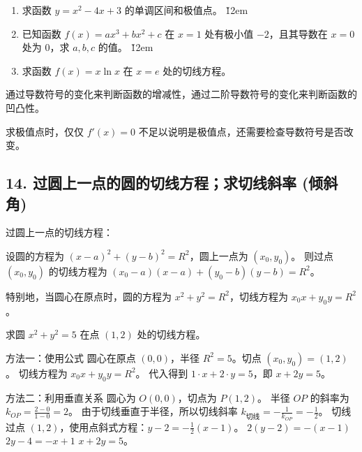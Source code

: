 \begin{problem}
\begin{enumerate}
    \item 求函数 $y = x^2 - 4x + 3$ 的单调区间和极值点。
          \v{12em}
    \item 已知函数 $f(x) = ax^3 + bx^2 + c$ 在 $x=1$ 处有极小值 $-2$，且其导数在 $x=0$ 处为 $0$，求 $a, b, c$ 的值。
          \v{12em}
    \item 求函数 $f(x) = x \ln x$ 在 $x=e$ 处的切线方程。
\end{enumerate}
\end{problem}
\begin{tips}
    通过导数符号的变化来判断函数的增减性，通过二阶导数符号的变化来判断函数的凹凸性。
\end{tips}
\begin{warning}
    求极值点时，仅仅 $f'(x)=0$ 不足以说明是极值点，还需要检查导数符号是否改变。
\end{warning}

\subsection*{14. 过圆上一点的圆的切线方程；求切线斜率 (倾斜角)}
\begin{theorem}
    过圆上一点的切线方程：

    设圆的方程为 $(x-a)^2 + (y-b)^2 = R^2$，圆上一点为 $(x_0, y_0)$。
    则过点 $(x_0, y_0)$ 的切线方程为 $(x_0-a)(x-a) + (y_0-b)(y-b) = R^2$。

    特别地，当圆心在原点时，圆的方程为 $x^2 + y^2 = R^2$，切线方程为 $x_0x + y_0y = R^2$。
\end{theorem}

\begin{example}
    求圆 $x^2 + y^2 = 5$ 在点 $(1, 2)$ 处的切线方程。
\end{example}
\begin{solution}
    方法一：使用公式
    圆心在原点 $(0,0)$，半径 $R^2=5$。切点 $(x_0, y_0) = (1, 2)$。
    切线方程为 $x_0x + y_0y = R^2$。
    代入得到 $1 \cdot x + 2 \cdot y = 5$，即 $x + 2y = 5$。

    方法二：利用垂直关系
    圆心为 $O(0,0)$，切点为 $P(1,2)$。
    半径 $OP$ 的斜率为 $k_{OP} = \frac{2-0}{1-0} = 2$。
    由于切线垂直于半径，所以切线斜率 $k_{切线} = -\frac{1}{k_{OP}} = -\frac{1}{2}$。
    切线过点 $(1,2)$，使用点斜式方程：$y - 2 = -\frac{1}{2}(x - 1)$。
    $2(y - 2) = -(x - 1)$
    $2y - 4 = -x + 1$
    $x + 2y = 5$。
\end{solution}

